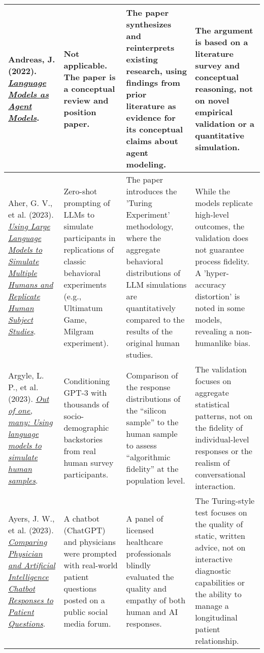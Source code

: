 {\begin{longtable}{| L{4.5cm} | L{3.5cm} | L{3.5cm} | L{3.5cm} |}
Andreas, J. (2022). \href{https://aclanthology.org/2022.findings-emnlp.423/}{\textit{Language Models as Agent Models}}. & Not applicable. The paper is a conceptual review and position paper. & The paper synthesizes and reinterprets existing research, using findings from prior literature as evidence for its conceptual claims about agent modeling. & The argument is based on a literature survey and conceptual reasoning, not on novel empirical validation or a quantitative simulation.
\\\hline
Aher, G. V., et al. (2023). \href{https://proceedings.mlr.press/v202/aher23a.html}{\textit{Using Large Language Models to Simulate Multiple Humans and Replicate Human Subject Studies}}. & Zero-shot prompting of LLMs to simulate participants in replications of classic behavioral experiments (e.g., Ultimatum Game, Milgram experiment). & The paper introduces the 'Turing Experiment' methodology, where the aggregate behavioral distributions of LLM simulations are quantitatively compared to the results of the original human studies. & While the models replicate high-level outcomes, the validation does not guarantee process fidelity. A 'hyper-accuracy distortion' is noted in some models, revealing a non-humanlike bias.
\\\hline
Argyle, L. P., et al. (2023). \href{https://doi.org/10.1017/pan.2023.2}{\textit{Out of one, many: Using language models to simulate human samples}}. & Conditioning GPT-3 with thousands of socio-demographic backstories from real human survey participants. & Comparison of the response distributions of the ``silicon sample'' to the human sample to assess ``algorithmic fidelity'' at the population level. & The validation focuses on aggregate statistical patterns, not on the fidelity of individual-level responses or the realism of conversational interaction.
\\\hline
Ayers, J. W., et al. (2023). \href{https://doi.org/10.1001/jamainternmed.2023.1284}{\textit{Comparing Physician and Artificial Intelligence Chatbot Responses to Patient Questions}}. & A chatbot (ChatGPT) and physicians were prompted with real-world patient questions posted on a public social media forum. & A panel of licensed healthcare professionals blindly evaluated the quality and empathy of both human and AI responses. & The Turing-style test focuses on the quality of static, written advice, not on interactive diagnostic capabilities or the ability to manage a longitudinal patient relationship.
\\\hline

\end{longtable}}
